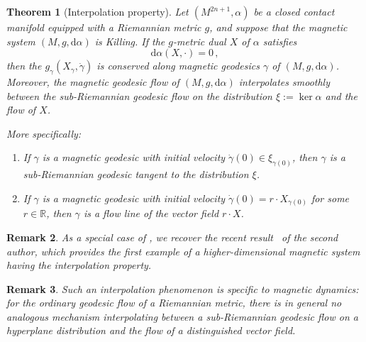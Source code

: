 \documentclass[11pt,reqno]{amsart}
\theoremstyle{plain}
\newtheorem{thm}{Theorem}[section]
\newtheorem{rem}[thm]{Remark}
\theoremstyle{definition}
\numberwithin{equation}{section}
\def\d{\delta}
\def\d{\delta}
\def\d{{\mathrm{d}}}
\newcommand{\gc}{\gamma}
\begin{document}
\begin{thm}[Interpolation property]\label{prop: general interpolation}
Let \((M^{2n+1}, \alpha)\) be a closed contact manifold equipped with a Riemannian metric \(g\), and suppose that the magnetic system \((M, g, \mathrm{d}\alpha)\) is Killing.  If the $g$-metric dual $X$ of $\alpha$ satisfies
\begin{equation}\label{it:prop hyp}
    \d\alpha(X,\cdot)=0 \, ,
\end{equation}
then the $g_{\gamma}(X_{\gamma}, \dot{\gamma})$ is conserved along magnetic geodesics $\gc$ of $(M,g,\d\alpha)$.\\
Moreover, the magnetic geodesic flow of \( (M, g, \mathrm{d}\alpha) \) interpolates smoothly between the sub-Riemannian geodesic flow on the distribution \( \xi := \ker \alpha \) and the flow of \( X \).

More specifically:
\begin{enumerate}
    \item \label{it:prop sR}If \( \gamma \) is a magnetic geodesic with initial velocity \( \dot{\gamma}(0) \in \xi_{\gc(0)} \), then \( \gamma \) is a sub-Riemannian geodesic tangent to the distribution \( \xi \).
    
    \item \label{it:prop 'Reeb'}If \( \gamma \) is a magnetic geodesic with initial velocity \( \dot{\gamma}(0) = r \cdot X_{\gamma(0)} \) for some \( r \in \mathbb{R} \), then \( \gamma \) is a flow line of the vector field \( r \cdot X \).
\end{enumerate}
\end{thm}
\begin{rem}
    As a special case of , we recover the recent result~\cite[Cor. 1.8]{ABM} of the second author, which provides the first example of a higher-dimensional magnetic system having the interpolation property.
\end{rem}
\begin{rem}
Such an interpolation phenomenon is specific to magnetic dynamics: for the ordinary geodesic flow of a Riemannian metric, there is in general no analogous mechanism interpolating between a sub-Riemannian geodesic flow on a hyperplane distribution and the flow of a distinguished vector field.
\end{rem}
\end{document}
